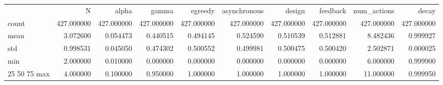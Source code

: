\begin{tabular}{lrrrrrrrrr}
 & N & alpha & gamma & egreedy & asynchronous & design & feedback & num_actions & decay \\
count & 427.000000 & 427.000000 & 427.000000 & 427.000000 & 427.000000 & 427.000000 & 427.000000 & 427.000000 & 427.000000 \\
mean & 3.072600 & 0.054473 & 0.440515 & 0.494145 & 0.524590 & 0.510539 & 0.512881 & 8.482436 & 0.999927 \\
std & 0.998531 & 0.045050 & 0.474302 & 0.500552 & 0.499981 & 0.500475 & 0.500420 & 2.502871 & 0.000025 \\
min & 2.000000 & 0.010000 & 0.000000 & 0.000000 & 0.000000 & 0.000000 & 0.000000 & 6.000000 & 0.999900 \\
25%
50%
75%
max & 4.000000 & 0.100000 & 0.950000 & 1.000000 & 1.000000 & 1.000000 & 1.000000 & 11.000000 & 0.999950 \\
\end{tabular}

